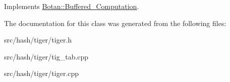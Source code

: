 Implements \hyperlink{classBotan_1_1Buffered__Computation_a7b2e6776ea9ded2e3f9da5a760b7d34b}{Botan\-::\-Buffered\-\_\-\-Computation}.



The documentation for this class was generated from the following files\-:\begin{DoxyCompactItemize}
\item 
src/hash/tiger/tiger.\-h\item 
src/hash/tiger/tig\-\_\-tab.\-cpp\item 
src/hash/tiger/tiger.\-cpp\end{DoxyCompactItemize}
